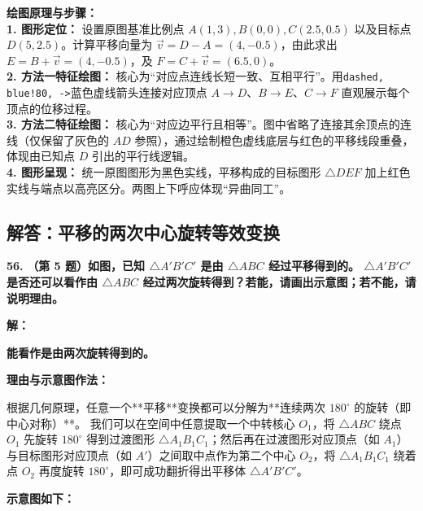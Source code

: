 \vspace{0.4cm}
{\small\color{blue!70!black}
\textbf{绘图原理与步骤：}\\
\textbf{1. 图形定位：} 设置原图基准比例点 $A(1,3), B(0,0), C(2.5,0.5)$ 以及目标点 $D(5,2.5)$。计算平移向量为 $\vec{v} = D-A = (4,-0.5)$，由此求出 $E = B + \vec{v} = (4,-0.5)$，及 $F = C + \vec{v} = (6.5,0)$。\\
\textbf{2. 方法一特征绘图：} 核心为“对应点连线长短一致、互相平行”。用\texttt{dashed, blue!80, ->}蓝色虚线箭头连接对应顶点 $A \to D$、$B \to E$、$C \to F$ 直观展示每个顶点的位移过程。\\
\textbf{3. 方法二特征绘图：} 核心为“对应边平行且相等”。图中省略了连接其余顶点的连线（仅保留了灰色的 $AD$ 参照），通过绘制橙色虚线底层与红色的平移线段重叠，体现由已知点 $D$ 引出的平行线逻辑。\\
\textbf{4. 图形呈现：} 统一原图图形为黑色实线，平移构成的目标图形 $\triangle DEF$ 加上红色实线与端点以高亮区分。两图上下呼应体现“异曲同工”。
}

\newpage

\newpage

\subsection{解答：平移的两次中心旋转等效变换}

\vspace{0.6cm}

\textbf{\LARGE 56.} \textbf{（第 5 题）如图，已知 $\triangle A'B'C'$ 是由 $\triangle ABC$ 经过平移得到的。 $\triangle A'B'C'$ 是否还可以看作由 $\triangle ABC$ 经过两次旋转得到？若能，请画出示意图；若不能，请说明理由。}

\vspace{0.4cm}
\textbf{解：}

\textbf{能看作是由两次旋转得到的。}

\textbf{理由与示意图作法：} 

根据几何原理，任意一个**平移**变换都可以分解为**连续两次 $180^\circ$ 的旋转（即中心对称）**。
我们可以在空间中任意提取一个中转核心 $O_1$，将 $\triangle ABC$ 绕点 $O_1$ 先旋转 $180^\circ$ 得到过渡图形 $\triangle A_1B_1C_1$；然后再在过渡图形对应顶点（如 $A_1$）与目标图形对应顶点（如 $A'$）之间取中点作为第二个中心 $O_2$，将 $\triangle A_1B_1C_1$ 绕着点 $O_2$ 再度旋转 $180^\circ$，即可成功翻折得出平移体 $\triangle A'B'C'$。

\textbf{示意图如下：}

